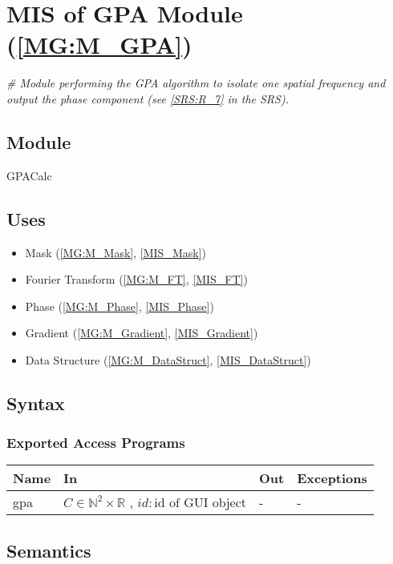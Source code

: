 \documentclass[12pt, titlepage]{article}
\begin{document}
\section{MIS of GPA Module (\texorpdfstring{\cref{MG:M_GPA}}))} \label{MIS_GPA}

\noindent\textit{{\#} Module performing the GPA algorithm to isolate one spatial 
frequency and output the phase component (see \cref{SRS:R_7} in the SRS).}

\subsection{Module}
GPACalc
\subsection{Uses}
\begin{itemize}
\item Mask (\cref{MG:M_Mask}, \cref{MIS_Mask})
\item Fourier Transform (\cref{MG:M_FT}, \cref{MIS_FT})
\item Phase (\cref{MG:M_Phase}, \cref{MIS_Phase})
\item Gradient (\cref{MG:M_Gradient}, \cref{MIS_Gradient})
\item Data Structure (\cref{MG:M_DataStruct}, \cref{MIS_DataStruct})
\end{itemize}

\subsection{Syntax}

\subsubsection{Exported Access Programs}

\begin{center}
\begin{tabular}{p{2cm} p{4cm} p{4cm} p{3cm}}
\hline
\textbf{Name} & \textbf{In} & \textbf{Out} & \textbf{Exceptions} \\
\hline
gpa & $C \in \mathbb{N}^2\times\mathbb{R}$ , $id : \text{id of GUI object}$ & - 
& - \\
\hline
\end{tabular}
\end{center}

\subsection{Semantics}
\end{document}
